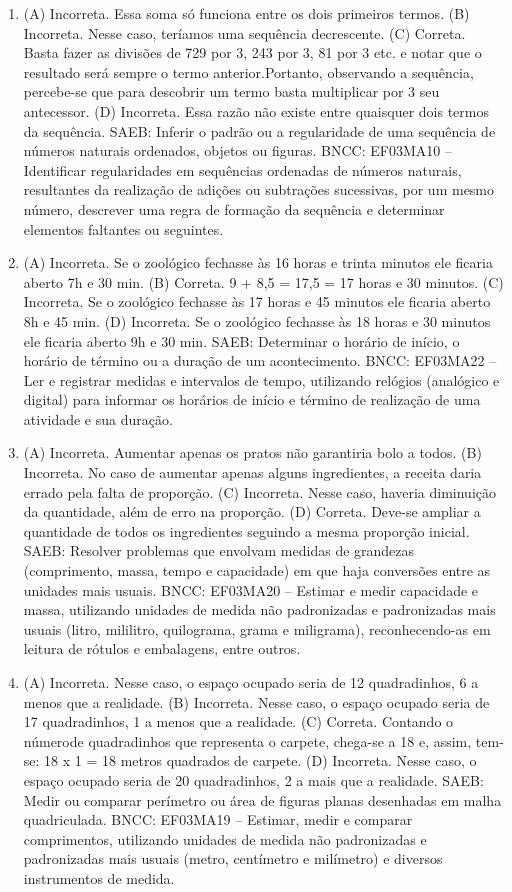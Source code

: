 \begin{enumerate}
\item
(A) Incorreta. Essa soma só funciona entre os dois primeiros termos.
(B) Incorreta. Nesse caso, teríamos uma sequência decrescente.
(C) Correta. Basta fazer as divisões de 729 por 3, 243 por 3, 81 por 3 etc. e notar que o resultado será sempre o termo anterior.Portanto, observando a sequência, percebe-se que para descobrir um termo basta multiplicar por 3 seu antecessor.
(D) Incorreta. Essa razão não existe entre quaisquer dois termos da sequência.
SAEB: Inferir o padrão ou a regularidade de uma sequência de números naturais ordenados, objetos ou figuras. 
BNCC: EF03MA10 -- Identificar regularidades em sequências ordenadas de números naturais,
resultantes da realização de adições ou subtrações sucessivas, por um mesmo número,
descrever uma regra de formação da sequência e determinar elementos faltantes ou seguintes.

\item
(A) Incorreta. Se o zoológico fechasse às 16 horas e trinta minutos ele ficaria aberto 7h e 30 min.
(B) Correta. 9 + 8,5 = 17,5 = 17 horas e 30 minutos.
(C) Incorreta. Se o zoológico fechasse às 17 horas e 45 minutos ele ficaria aberto 8h e 45 min.
(D) Incorreta. Se o zoológico fechasse às 18 horas e 30 minutos ele ficaria aberto 9h e 30 min.
SAEB: Determinar o horário de início, o horário de término ou a duração de um acontecimento.
BNCC: EF03MA22 -- Ler e registrar medidas e intervalos de tempo, utilizando relógios (analógico e
digital) para informar os horários de início e término de realização de uma atividade e sua duração.

\item
(A) Incorreta. Aumentar apenas os pratos não garantiria bolo a todos.
(B) Incorreta. No caso de aumentar apenas alguns ingredientes, a receita daria errado pela falta de proporção.
(C) Incorreta. Nesse caso, haveria diminuição da quantidade, além de erro na proporção.
(D) Correta. Deve-se ampliar a quantidade de todos os ingredientes seguindo a mesma proporção inicial.
SAEB: Resolver problemas que envolvam medidas de grandezas (comprimento, massa, tempo e capacidade) em que haja conversões entre as
unidades mais usuais.
BNCC: EF03MA20 -- Estimar e medir capacidade e massa, utilizando unidades de medida não
padronizadas e padronizadas mais usuais (litro, mililitro, quilograma, grama e miligrama),
reconhecendo-as em leitura de rótulos e embalagens, entre outros.

\item
(A) Incorreta. Nesse caso, o espaço ocupado seria de 12 quadradinhos, 6 a menos que a realidade.
(B) Incorreta. Nesse caso, o espaço ocupado seria de 17 quadradinhos, 1 a menos que a realidade.
(C) Correta. Contando o númerode quadradinhos que representa o carpete, chega-se a 18 e,
assim, tem-se: 18 x 1 = 18 metros quadrados de carpete.
(D) Incorreta. Nesse caso, o espaço ocupado seria de 20 quadradinhos, 2 a mais que a realidade.
SAEB: Medir ou comparar perímetro ou área de figuras planas desenhadas em malha quadriculada.
BNCC: EF03MA19 -- Estimar, medir e comparar comprimentos, utilizando unidades de medida
não padronizadas e padronizadas mais usuais (metro, centímetro e milímetro) e diversos
instrumentos de medida.


\end{enumerate}

